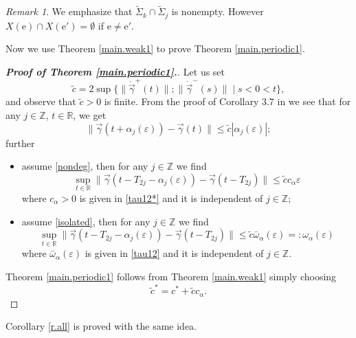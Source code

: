 \documentclass[10pt]{article}
\numberwithin{equation}{section}
\def\ga{\vec{\gamma}}
\def\ep{\varepsilon}
\def\Z{{\mathbb Z}}
\def\R{{\mathbb R}}
\def\ee{{\mathrm e}}
\theoremstyle{definition}
\theoremstyle{remark}
\newtheorem{remark}[theorem]{Remark}
\begin{document}
  \begin{remark}\label{r.disjointX}
    We emphasize that $\tilde{\Sigma}_k \cap \tilde{\Sigma}_j$  is nonempty. However $X(\ee) \cap X(\ee') = \emptyset$ if $\ee \ne \ee'$.
  \end{remark}





Now we use Theorem \ref{main.weak1}  to prove  Theorem
 \ref{main.periodic1}.


\begin{proof}[\textbf{Proof of Theorem \ref{main.periodic1}.}] %



Let us set
\begin{equation}\label{ctilde}\tilde{c} = 2 \sup
\{\|\dot{\ga}^+(t)\|; \|\dot{\ga}^-(s)\| \mid s<0<t \},
\end{equation}
and observe that $\tilde{c}>0$ is finite.
From the proof of Corollary 3.7 in \cite{CFPrestate} we see that %
 for any $j \in \Z$,  $t\in\R$,  we get
  \begin{equation}\label{easy}
     \| \ga(t+ \alpha_j(\ep))- \ga(t)\| \le  \tilde{c} |\alpha_j(\ep)|;
   \end{equation}
further
 \begin{itemize}
   \item assume \eqref{nondeg}, then   for any $j \in \Z$ we find
   \begin{equation}\label{easier}
 \sup_{t \in \R} \| \ga(t-T_{2j}- \alpha_j(\ep))- \ga(t-T_{2j})\|  \le  \tilde{c}   c_{\alpha} \ep
     \end{equation}
  where $c_{\alpha}>0$ is given in \eqref{tau12*} and it is independent of $j \in \Z$;
   \item assume
   \eqref{isolated}, then   for any $j \in \Z$ we find
 $$  \sup_{t \in \R} \| \ga(t-T_{2j}- \alpha_j(\ep))- \ga(t-T_{2j})\|   \le  \tilde{c}   \bar{\omega}_{\alpha} (\ep ) =:
 \omega_{\alpha} (\ep )$$
  where  $\bar{\omega}_{\alpha} (\ep )$ is given in \eqref{tau12}
  and it is independent of $j\in \Z$.
 \end{itemize}
 Theorem \ref{main.periodic1} follows from Theorem  \ref{main.weak1}
 simply choosing
 \begin{equation}\label{deftildecstar}
 \tilde{c}^*=c^*+ \tilde{c}   c_{\alpha}.
 \end{equation}
\end{proof}

  Corollary \ref{r.all} is proved with the same idea.
\end{document}
